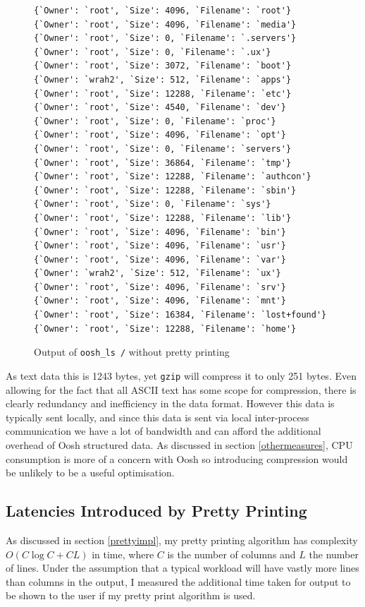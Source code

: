 \documentclass[12pt,twoside,notitlepage]{report}
\begin{document}
\begin{figure}[h]
\begin{Verbatim}[frame=single,framerule=0.2pt,framesep=5pt] 
{`Owner': `root', `Size': 4096, `Filename': `root'}
{`Owner': `root', `Size': 4096, `Filename': `media'}
{`Owner': `root', `Size': 0, `Filename': `.servers'}
{`Owner': `root', `Size': 0, `Filename': `.ux'}
{`Owner': `root', `Size': 3072, `Filename': `boot'}
{`Owner': `wrah2', `Size': 512, `Filename': `apps'}
{`Owner': `root', `Size': 12288, `Filename': `etc'}
{`Owner': `root', `Size': 4540, `Filename': `dev'}
{`Owner': `root', `Size': 0, `Filename': `proc'}
{`Owner': `root', `Size': 4096, `Filename': `opt'}
{`Owner': `root', `Size': 0, `Filename': `servers'}
{`Owner': `root', `Size': 36864, `Filename': `tmp'}
{`Owner': `root', `Size': 12288, `Filename': `authcon'}
{`Owner': `root', `Size': 12288, `Filename': `sbin'}
{`Owner': `root', `Size': 0, `Filename': `sys'}
{`Owner': `root', `Size': 12288, `Filename': `lib'}
{`Owner': `root', `Size': 4096, `Filename': `bin'}
{`Owner': `root', `Size': 4096, `Filename': `usr'}
{`Owner': `root', `Size': 4096, `Filename': `var'}
{`Owner': `wrah2', `Size': 512, `Filename': `ux'}
{`Owner': `root', `Size': 4096, `Filename': `srv'}
{`Owner': `root', `Size': 4096, `Filename': `mnt'}
{`Owner': `root', `Size': 16384, `Filename': `lost+found'}
{`Owner': `root', `Size': 12288, `Filename': `home'}
\end{Verbatim}
\caption{Output of {\tt oosh\_ls /} without pretty printing}
\label{lsroot}
\end{figure}

As text data this is 1243 bytes, yet {\tt gzip} will compress it to
only 251 bytes. Even allowing for the fact that all ASCII text has
some scope for compression, there is clearly redundancy and inefficiency in the
data format. However this data is typically sent locally, and since
this data is sent via local inter-process communication we have a lot
of bandwidth and can afford the additional overhead of Oosh structured
data. As discussed in section \ref{othermeasures}, CPU consumption is
more of a concern with Oosh so introducing compression would be
unlikely to be a useful optimisation.

\subsection{Latencies Introduced by Pretty Printing}
\label{prettyspeed}
As discussed in section \ref{prettyimpl}, my pretty printing algorithm
has complexity $O(C \log C + CL)$ in time, where $C$ is the number of
columns and $L$ the number of lines. Under the assumption that a
typical workload will have vastly more lines than columns in the
output, I measured the additional time taken for output to be shown to
the user if my pretty print algorithm is used.
\end{document}
